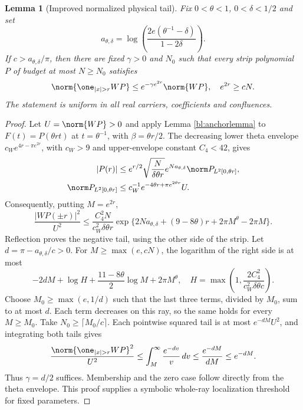 \documentclass[11pt,a4paper]{article}
\numberwithin{equation}{section}
\newtheorem{lemma}[theorem]{Lemma}
\theoremstyle{definition}\newtheorem{definition}[theorem]{Definition}
\theoremstyle{remark}\newtheorem{remark}[theorem]{Remark}
\begin{document}
\begin{lemma}[Improved normalized physical tail]\label{bl:newtail}
Fix $0<\theta<1$, $0<\delta<1/2$ and set
\begin{equation}\label{bl:anew}
 a_{\theta,\delta}=\log\left(\frac{2e(\theta^{-1}-\delta)}{1-2\delta}\right).
\end{equation}
If $c>a_{\theta,\delta}/\pi$, then there are fixed $\gamma>0$ and $N_0$ such that every strip polynomial $P$ of budget at most $N\ge N_0$ satisfies
\begin{equation}\label{bl:newtailformula}
 \norm{\one_{|x|>r}WP}\le e^{-\gamma e^{2r}}\norm{WP},\quad e^{2r}\ge cN.
\end{equation}
The statement is uniform in all real carriers, coefficients and confluences.
\end{lemma}
\begin{proof}
Let $U=\norm{WP}>0$ and apply Lemma \ref{bl:anchorlemma} to $F(t)=P(\theta rt)$ at $t=\theta^{-1}$, with $\beta=\theta r/2$. The decreasing lower theta envelope $c_We^{4r-\pi e^{2r}}$, with $c_W>9$ and upper-envelope constant $C_4<42$, gives
\begin{align}
 |P(r)|&\le e^{r/2}\sqrt{\frac{N}{\delta\theta r}}
 e^{Na_{\theta,\delta}}\norm P_{L^2[0,\theta r]},\\
 \norm P_{L^2[0,\theta r]}&\le c_W^{-1}e^{-4\theta r+\pi e^{2\theta r}}U.
\end{align}
Consequently, putting $M=e^{2r}$,
\begin{equation}\label{bl:newdensity}
 \frac{|WP(\pm r)|^2}{U^2}
 \le\frac{C_4^2N}{c_W^2\delta\theta r}
 \exp\{2Na_{\theta,\delta}+(9-8\theta)r+2\pi M^\theta-2\pi M\}.
\end{equation}
Reflection proves the negative tail, using the other side of the strip. Let $d=\pi-a_{\theta,\delta}/c>0$. For $M\ge\max(e,cN)$, the logarithm of the right side is at most
\begin{equation}
 -2dM+\log H+\frac{11-8\theta}{2}\log M+2\pi M^\theta,
 \quad H=\max\left(1,\frac{2C_4^2}{c_W^2\delta\theta c}\right).
\end{equation}
Choose $M_0\ge\max(e,1/d)$ such that the last three terms, divided by $M_0$, sum to at most $d$. Each term decreases on this ray, so the same holds for every $M\ge M_0$. Take $N_0\ge\lceil M_0/c\rceil$. Each pointwise squared tail is at most $e^{-dM}U^2$, and integrating both tails gives
\begin{equation}
 \frac{\norm{\one_{|x|>r}WP}^2}{U^2}
 \le\int_M^\infty\frac{e^{-dv}}v\,dv
 \le\frac{e^{-dM}}{dM}\le e^{-dM}.
\end{equation}
Thus $\gamma=d/2$ suffices. Membership and the zero case follow directly from the theta envelope. This proof supplies a symbolic whole-ray localization threshold for fixed parameters.
\end{proof}
\end{document}
